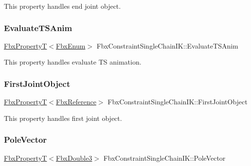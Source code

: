 This property handles end joint object. \mbox{\label{class_fbx_constraint_single_chain_i_k_ae2f5d57a658c12c748ceeccd31809a3f}} 
\subsubsection{\texorpdfstring{Evaluate\+T\+S\+Anim}{EvaluateTSAnim}}
{\footnotesize\ttfamily \hyperlink{class_fbx_property_t}{Fbx\+PropertyT}$<$\hyperlink{fbxtypes_8h_a9a28614cb4272a0ad7d748eda7f3d3e5}{Fbx\+Enum}$>$ Fbx\+Constraint\+Single\+Chain\+I\+K\+::\+Evaluate\+T\+S\+Anim}

This property handles evaluate TS animation. \mbox{\label{class_fbx_constraint_single_chain_i_k_ad33341677c0cf0689bcbc1f4e4eda23a}} 
\subsubsection{\texorpdfstring{First\+Joint\+Object}{FirstJointObject}}
{\footnotesize\ttfamily \hyperlink{class_fbx_property_t}{Fbx\+PropertyT}$<$\hyperlink{fbxtypes_8h_a44df6a2eec915cf27cd481e5c5e48a24}{Fbx\+Reference}$>$ Fbx\+Constraint\+Single\+Chain\+I\+K\+::\+First\+Joint\+Object}

This property handles first joint object. \mbox{\label{class_fbx_constraint_single_chain_i_k_a0fb576e54a64caab8e6609060e020ae2}} 
\subsubsection{\texorpdfstring{Pole\+Vector}{PoleVector}}
{\footnotesize\ttfamily \hyperlink{class_fbx_property_t}{Fbx\+PropertyT}$<$\hyperlink{fbxtypes_8h_ae0a96f14cde566774c7553aa7523b7a7}{Fbx\+Double3}$>$ Fbx\+Constraint\+Single\+Chain\+I\+K\+::\+Pole\+Vector}


